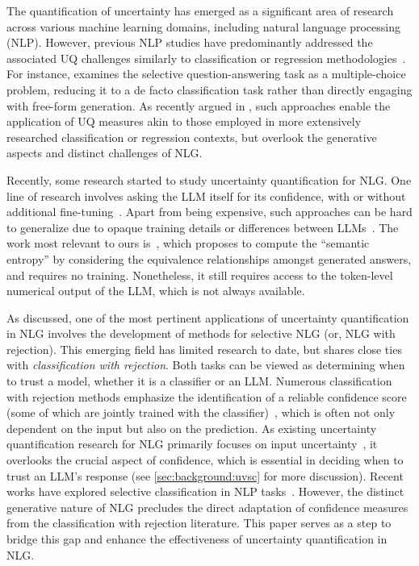 The quantification of uncertainty has emerged as a significant area of research across various machine learning domains, including natural language processing (NLP). 
However, previous NLP studies have predominantly addressed the associated UQ challenges similarly to classification or regression methodologies~\citep{desai-durrett-2020-calibration,jiang-etal-2021-know,kamath-etal-2020-selective,wang-etal-2022-uncertainty,xiong2023llms}. 
For instance, \citet{kamath-etal-2020-selective} examines the selective question-answering task as a multiple-choice problem, reducing it to a de facto classification task rather than directly engaging with free-form generation. 
As recently argued in \cite{kuhn2023semantic}, such approaches enable the application of UQ measures akin to those employed in more extensively researched classification or regression contexts, but overlook the generative aspects and distinct challenges of NLG.

Recently, some research started to study uncertainty quantification for NLG.
One line of research involves asking the LLM itself for its confidence, with or without additional fine-tuning~\citep{kadavath2022language,Lin2022TeachingMT, DBLP:journals/corr/abs-2012-14983,chen2023quantifying}.
Apart from being expensive, such approaches can be hard to generalize due to opaque training details or differences between LLMs~\citep{kuhn2023semantic}. 
The work most relevant to ours is~\cite{kuhn2023semantic}, which proposes to compute the ``semantic entropy'' by considering the equivalence relationships amongst generated answers, and requires no training.
Nonetheless, it still requires access to the token-level numerical output of the LLM, which is not always available.

As discussed, one of the most pertinent applications of uncertainty quantification in NLG involves the development of methods for selective NLG (or, NLG with rejection). 
This emerging field has limited research to date, but shares close ties with \textit{classification with rejection}.
Both tasks can be viewed as determining when to trust a model, whether it is a classifier or an LLM. 
Numerous classification with rejection methods emphasize the identification of a reliable confidence score (some of which are jointly trained with the classifier)~\citep{Corbiere2019AddressingConfidence,Fumera2000RejectThresholds,Geifman2017SelectiveNetworks,Jiang2018ToClassifier}, which is often not only dependent on the input but also on the prediction. 
As existing uncertainty quantification research for NLG primarily focuses on input uncertainty~\citep{kuhn2023semantic,malinin2021uncertainty}, it overlooks the crucial aspect of confidence, which is essential in deciding when to trust an LLM's response (see \cref{sec:background:uvsc} for more discussion). 
Recent works have explored selective classification in NLP tasks~\citep{varshney-etal-2022-investigating,varshney-etal-2022-towards}.
However, the distinct generative nature of NLG precludes the direct adaptation of confidence measures from the classification with rejection literature. 
This paper serves as a step to bridge this gap and enhance the effectiveness of uncertainty quantification in NLG. 


